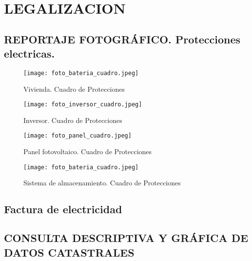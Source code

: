\documentclass{article}
\begin{document}
\chapter{LEGALIZACION}


\section{REPORTAJE FOTOGRÁFICO. Protecciones electricas.}
\begin{figure}[H]
    \caption{Vivienda. Cuadro de Protecciones}
    \centering
    \texttt{[image: foto\_bateria\_cuadro.jpeg]}
\end{figure}

\begin{figure}[H]
    \caption{Inversor. Cuadro de Protecciones}
    \centering
    \texttt{[image: foto\_inversor\_cuadro.jpeg]}
\end{figure}

\begin{figure}[H]
    \caption{Panel fotovoltaico. Cuadro de Protecciones}
    \centering
    \texttt{[image: foto\_panel\_cuadro.jpeg]}
\end{figure}

\begin{figure}[H]
    \caption{Sistema de almacenamiento. Cuadro de Protecciones}
    \centering
    \texttt{[image: foto\_bateria\_cuadro.jpeg]}
\end{figure}




\section{Factura de electricidad}


\section{CONSULTA DESCRIPTIVA Y GRÁFICA DE DATOS CATASTRALES}

\end{document}
